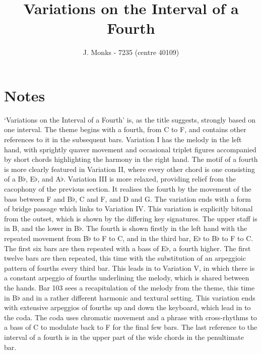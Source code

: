 \documentclass[12pt]{article} %
\title{Variations on the Interval of a Fourth}
\author{J. Monks - 7235 (centre 40109)}
\date{} %
\begin{document}
\maketitle
{}


\vspace{3 cm}

\section*{Notes}

`Variations on the Interval of a Fourth' is, as the title suggests, strongly based on one interval. The theme begins with a fourth, from C to F, and contains other references to it in the subsequent bars. Variation I has the melody in the left hand, with sprightly quaver movement and occasional triplet figures accompanied by short chords highlighting the harmony in the right hand. The motif of a fourth is more clearly featured in Variation II, where every other chord is one consisting of a B$\flat$, E$\flat$, and A$\flat$. Variation III is more relaxed, providing relief from the cacophony of the previous section. It realises the fourth by the movement of the bass between F and B$\flat$, C and F, and D and G. The variation ends with a form of bridge passage which links to Variation IV. This variation is explicitly bitonal from the outset, which is shown by the differing key signatures. The upper staff is in B, and the lower in B$\flat$. The fourth is shown firstly in the left hand with the repeated movement from B$\flat$ to F to C, and in the third bar, E$\flat$ to B$\flat$ to F to C. The first six bars are then repeated with a bass of E$\flat$, a fourth higher. The first twelve bars are then repeated, this time with the substitution of an arpeggioic pattern of fourths every third bar. This leads in to Variation V, in which there is a constant arpeggio of fourths underlining the melody, which is shared between the hands. Bar 103 sees a recapitulation of the melody from the theme, this time in B$\flat$ and in a rather different harmonic and textural setting. This variation ends with extensive arpeggios of fourths up and down the keyboard, which lead in to the coda. The coda uses chromatic movement and a phrase with cross-rhythms to a bass of C to modulate back to F for the final few bars. The last reference to the interval of a fourth is in the upper part of the wide chords in the penultimate bar.
\end{document}
